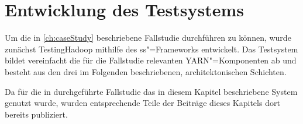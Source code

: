\chapter{Entwicklung des Testsystems}
\label{ch:model}

Um die in \cref{ch:caseStudy} beschriebene Fallstudie durchführen zu können, wurde zunächst TestingHadoop mithilfe des \gls{ss}"=Frameworks entwickelt.
Das Testsystem bildet \uA vereinfacht die für die Fallstudie relevanten YARN"=Komponenten ab und besteht aus den drei im Folgenden beschriebenen, architektonischen Schichten.

Da für die in \cite{Eberhardinger2018} durchgeführte Fallstudie das in diesem Kapitel beschriebene System genutzt wurde, wurden entsprechende Teile der Beiträge dieses Kapitels dort bereits publiziert.








